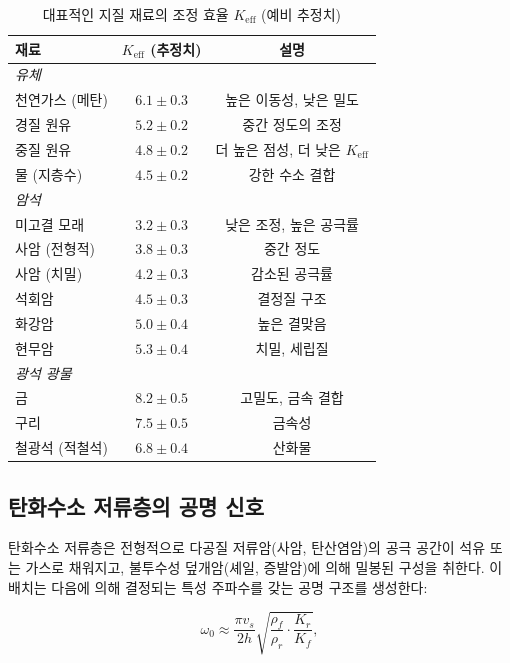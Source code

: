 \documentclass[12pt,a4paper]{article}
\theoremstyle{remark}
\newcommand{\Keff}{K_{\mathrm{eff}}}
\begin{document}
	\begin{table}[htbp]
		\centering
		\caption{대표적인 지질 재료의 조정 효율 \(\Keff\) (예비 추정치)}
		\label{tab:keff-geology}
		\small
		\begin{tabular}{lcc}
			\toprule
			\textbf{재료} & \textbf{\(\Keff\) (추정치)} & \textbf{설명} \\
			\midrule
			\multicolumn{3}{l}{\textit{유체}} \\
			천연가스 (메탄) & $6.1 \pm 0.3$ & 높은 이동성, 낮은 밀도 \\
			경질 원유 & $5.2 \pm 0.2$ & 중간 정도의 조정 \\
			중질 원유 & $4.8 \pm 0.2$ & 더 높은 점성, 더 낮은 \(\Keff\) \\
			물 (지층수) & $4.5 \pm 0.2$ & 강한 수소 결합 \\
			\hline
			\multicolumn{3}{l}{\textit{암석}} \\
			미고결 모래 & $3.2 \pm 0.3$ & 낮은 조정, 높은 공극률 \\
			사암 (전형적) & $3.8 \pm 0.3$ & 중간 정도 \\
			사암 (치밀) & $4.2 \pm 0.3$ & 감소된 공극률 \\
			석회암 & $4.5 \pm 0.3$ & 결정질 구조 \\
			화강암 & $5.0 \pm 0.4$ & 높은 결맞음 \\
			현무암 & $5.3 \pm 0.4$ & 치밀, 세립질 \\
			\hline
			\multicolumn{3}{l}{\textit{광석 광물}} \\
			금 & $8.2 \pm 0.5$ & 고밀도, 금속 결합 \\
			구리 & $7.5 \pm 0.5$ & 금속성 \\
			철광석 (적철석) & $6.8 \pm 0.4$ & 산화물 \\
			\bottomrule
		\end{tabular}
	\end{table}
	
	\subsection{탄화수소 저류층의 공명 신호}
	
	탄화수소 저류층은 전형적으로 다공질 저류암(사암, 탄산염암)의 공극 공간이 석유 또는 가스로 채워지고, 불투수성 덮개암(셰일, 증발암)에 의해 밀봉된 구성을 취한다. 이 배치는 다음에 의해 결정되는 특성 주파수를 갖는 공명 구조를 생성한다:
	
	\begin{equation}
		\omega_0 \approx \frac{\pi v_s}{2h} \sqrt{\frac{\rho_f}{\rho_r} \cdot \frac{K_r}{K_f}},
		\label{eq:resonant-frequency}
	\end{equation}
	
\end{document}
